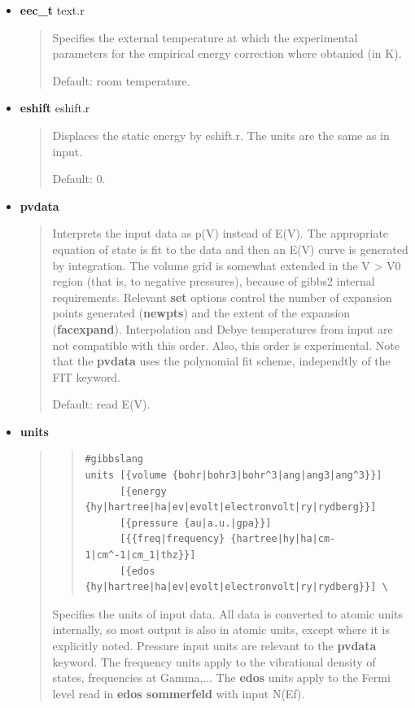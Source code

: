 \documentclass[a4paper]{article}
\begin{document}
\begin{itemize}
\item \textbf{eec\_t} text.r

\begin{quote}
Specifies the external temperature at which the experimental
parameters for the empirical energy correction where obtanied (in
K).

Default: room temperature.
\end{quote}

\item \textbf{eshift} eshift.r

\begin{quote}
Displaces the static energy by eshift.r. The units are the same as
in input.

Default: 0.
\end{quote}

\item \textbf{pvdata}

\begin{quote}
Interprets the input data as p(V) instead of E(V). The appropriate
equation of state is fit to the data and then an E(V) curve is
generated by integration. The volume grid is somewhat extended in
the V > V0 region (that is, to negative pressures), because of
gibbs2 internal requirements. Relevant \textbf{set} options control the
number of expansion points generated (\textbf{newpts}) and the extent of
the expansion (\textbf{facexpand}). Interpolation and Debye temperatures
from input are not compatible with this order. Also, this order is
experimental. Note that the \textbf{pvdata} uses the polynomial fit
scheme, independtly of the FIT keyword.

Default: read E(V).
\end{quote}

\item \textbf{units}

\begin{quote}
\begin{quote}
\begin{verbatim}
#gibbslang
units [{volume {bohr|bohr3|bohr^3|ang|ang3|ang^3}}]
      [{energy {hy|hartree|ha|ev|evolt|electronvolt|ry|rydberg}}]
      [{pressure {au|a.u.|gpa}}]
      [{{freq|frequency} {hartree|hy|ha|cm-1|cm^-1|cm_1|thz}}]
      [{edos {hy|hartree|ha|ev|evolt|electronvolt|ry|rydberg}}] \
\end{verbatim}
\end{quote}

Specifies the units of input data. All data is converted to atomic
units internally, so most output is also in atomic units, except
where it is explicitly noted. Pressure input units are relevant to
the \textbf{pvdata} keyword. The frequency units apply to the
vibrational density of states, frequencies at Gamma,... The
\textbf{edos} units apply to the Fermi level read in \textbf{edos sommerfeld}
with input N(Ef).


\end{quote}
\end{itemize}
\end{document}
